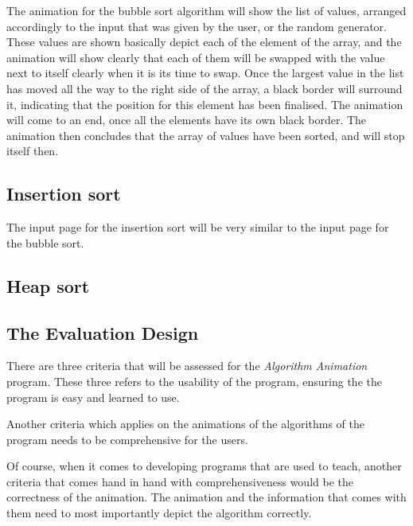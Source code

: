 The animation for the bubble sort algorithm will show the list of values, arranged accordingly to the input that was given by the user, or the random generator. These values are shown basically depict each of the element of the array, and the animation will show clearly that each of them will be swapped with the value next to itself clearly when it is its time to swap. Once the largest value in the list has moved all the way to the right side of the array, a black border will surround it, indicating that the position for this element has been finalised. The animation will come to an end, once all the elements have its own black border. The animation then concludes that the array of values have been sorted, and will stop itself then.

\newpage
{}


\newpage

\subsection{Insertion sort}

The input page for the insertion sort will be very similar to the input page for the bubble sort. 

\subsection{Heap sort}

\subsection{The Evaluation Design}

There are three criteria that will be assessed for the \textit{Algorithm Animation} program. These three refers to the usability of the program, ensuring the the program is easy and learned to use. 

Another criteria which applies on the animations of the algorithms of the program needs to be comprehensive for the users.

Of course, when it comes to developing programs that are used to teach, another criteria that comes hand in hand with comprehensiveness would be the correctness of the animation. The animation and the information that comes with them need to most importantly depict the algorithm correctly.





